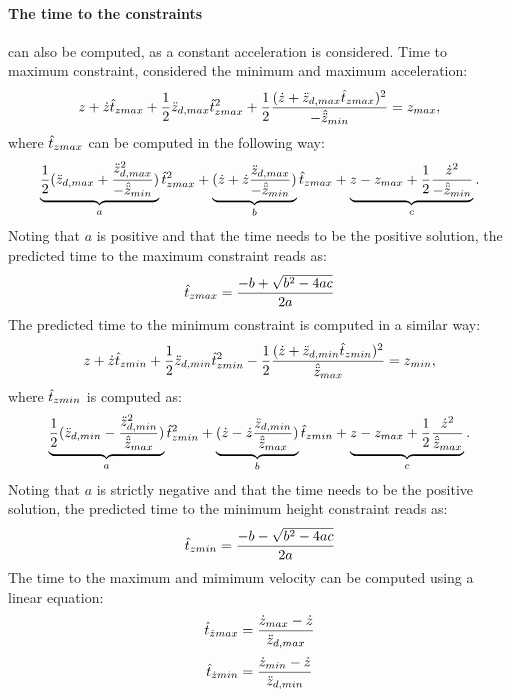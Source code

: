 \paragraph{The time to the constraints} can also be computed, as a constant acceleration is considered. Time to maximum constraint, considered the minimum and maximum acceleration:
\begin{equation}
    z + \dot{z}\hat{t}_{zmax} + \frac{1}{2}\ddot{z}_{d,max}\hat{t}_{zmax}^2 + \frac{1}{2}\frac{(\dot{z} +\ddot{z}_{d,max}\hat{t}_{zmax})^2}{-\hat{\ddot{z}}_{min}}= z_{max},
\end{equation}
where $\hat{t}_{zmax}$ can be computed in the following way:
\begin{equation}
    \underbrace{\frac{1}{2}(\ddot{z}_{d,max} + \frac{\ddot{z}_{d,max}^2}{-\hat{\ddot{z}}_{min}})}_a\hat{t}_{zmax}^2 + \underbrace{(\dot{z} + \dot{z}\frac{\ddot{z}_{d,max}}{-\hat{\ddot{z}}_{min}})}_b\hat{t}_{zmax} + \underbrace{z - z_{max} + \frac{1}{2}\frac{\dot{z}^2}{-\hat{\ddot{z}}_{min}}}_c.
\end{equation}
Noting that $a$ is positive and that the time needs to be the positive solution, the predicted time to the maximum constraint reads as:
\begin{equation}
    \hat{t}_{zmax}=\frac{-b + \sqrt{b^2 -4ac}}{2a}
\end{equation}
\paraskip
The predicted time to the minimum constraint is computed in a similar way:
\begin{equation}
    z + \dot{z}\hat{t}_{zmin} + \frac{1}{2}\ddot{z}_{d,min}\hat{t}_{zmin}^2 - \frac{1}{2}\frac{(\dot{z} +\ddot{z}_{d,min}\hat{t}_{zmin})^2}{\hat{\ddot{z}}_{max}}= z_{min},
\end{equation}
where $\hat{t}_{zmin}$ is computed as:
\begin{equation}
    \underbrace{\frac{1}{2}(\ddot{z}_{d,min} - \frac{\ddot{z}_{d,min}^2}{\hat{\ddot{z}}_{max}})}_a\hat{t}_{zmin}^2 + \underbrace{(\dot{z} - \dot{z}\frac{\ddot{z}_{d,min}}{\hat{\ddot{z}}_{max}})}_b\hat{t}_{zmin} + \underbrace{z - z_{max} + \frac{1}{2}\frac{\dot{z}^2}{\hat{\ddot{z}}_{max}}}_c.
\end{equation}
Noting that $a$ is strictly negative and that the time needs to be the positive solution, the predicted time to the minimum height constraint reads as:
\begin{equation}
    \hat{t}_{zmin}=\frac{-b - \sqrt{b^2 -4ac}}{2a}
\end{equation}
\paraskip
The time to the maximum and mimimum velocity can be computed using a linear equation:
\begin{equation}
	\hat{t}_{\dot{z}max} = \frac{\dot{z}_{max} - \dot{z}}{\ddot{z}_{d,max}}
\end{equation}
\begin{equation}
	\hat{t}_{\dot{z}min} = \frac{\dot{z}_{min} - \dot{z}}{\ddot{z}_{d,min}}
\end{equation}

